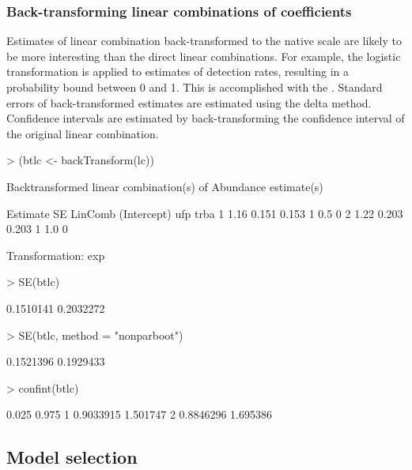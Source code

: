 \documentclass[article,shortnames]{jss}
\begin{document}
\subsubsection{Back-transforming linear combinations of coefficients}

Estimates of linear combination back-transformed to the native scale
are likely to be more interesting than the direct linear combinations.
For example, the logistic transformation is applied to estimates of
detection rates, resulting in a probability bound between 0 and
1. This is accomplished with the .  Standard
errors of back-transformed estimates are estimated using the delta
method.  Confidence intervals are estimated by back-transforming the
confidence interval of the original linear combination.

\begin{Schunk}
\begin{Sinput}
> (btlc <- backTransform(lc))
\end{Sinput}
\begin{Soutput}
Backtransformed linear combination(s) of Abundance estimate(s)

  Estimate    SE LinComb (Intercept) ufp trba
1     1.16 0.151   0.153           1 0.5    0
2     1.22 0.203   0.203           1 1.0    0

Transformation: exp 
\end{Soutput}
\begin{Sinput}
> SE(btlc)
\end{Sinput}
\begin{Soutput}
[1] 0.1510141 0.2032272
\end{Soutput}
\begin{Sinput}
> SE(btlc, method = "nonparboot")
\end{Sinput}
\begin{Soutput}
[1] 0.1521396 0.1929433
\end{Soutput}
\begin{Sinput}
> confint(btlc)
\end{Sinput}
\begin{Soutput}
      0.025    0.975
1 0.9033915 1.501747
2 0.8846296 1.695386
\end{Soutput}
\end{Schunk}


\subsection{Model selection} 
\end{document}
